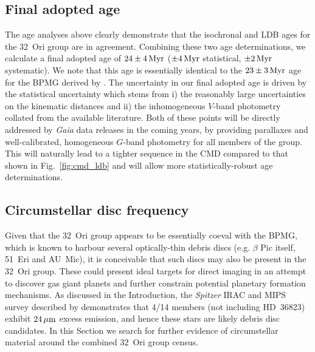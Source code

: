 \documentclass[usenatbib]{mnras}
\begin{document}
\subsection{Final adopted age}
\label{final_adopted_age}

The age analyses above clearly demonstrate that the isochronal and LDB
ages for the 32~Ori group are in agreement. Combining these two age
determinations, we calculate a final adopted age of $24\pm4\,\rm{Myr}$
($\pm4\,\rm{Myr}$ statistical, $\pm2\,\rm{Myr}$ systematic).  We note
that this age is essentially identical to the $23\pm3\,\rm{Myr}$ age
for the BPMG derived by \cite{Mamajek14}.  The uncertainty in our
final adopted age is driven by the statistical uncertainty which stems
from i) the reasonably large uncertainties on the kinematic distances
and ii) the inhomogeneous $V$-band photometry collated from the
available literature. Both of these points will be directly addressed
by \emph{Gaia} data releases in the coming years, by providing
parallaxes and well-calibrated, homogeneous $G$-band photometry for
all members of the group. This will naturally lead to a tighter
sequence in the CMD compared to that shown in Fig.~\ref{fig:cmd_ldb}
and will allow more statistically-robust age determinations.

\subsection{Circumstellar disc frequency}
\label{disc_frequency}

Given that the 32~Ori group appears to be essentially coeval with the
BPMG, which is known to harbour several optically-thin debris discs
(e.g. $\beta$ Pic itself, 51~Eri and AU~Mic), it is conceivable that
such discs may also be present in the 32~Ori group. These could
present ideal targets for direct imaging in an attempt to discover gas
giant planets and further constrain potential planetary formation
mechanisms.  As discussed in the Introduction, the \emph{Spitzer} IRAC and MIPS
survey described by \cite{Shvonski16} demonstrates that 4/14
members (not including HD~36823) exhibit $24\,\rm{\mu m}$ excess
emission, and hence these stars are likely debris disc candidates. In
this Section we search for further evidence of circumstellar material
around the combined 32~Ori group census.
\end{document}

